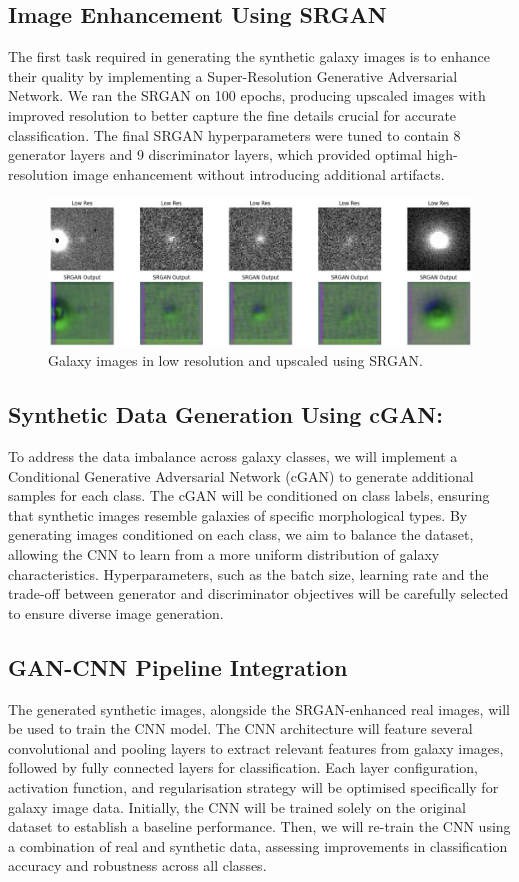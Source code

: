 \documentclass[10pt,twocolumn,letterpaper]{article}
\begin{document}
\subsection{Image Enhancement Using SRGAN}
The first task required in generating the synthetic galaxy images is to enhance their quality by implementing a Super-Resolution Generative Adversarial Network.
We ran the SRGAN on 100 epochs, producing upscaled images with improved resolution to better capture the fine details crucial for accurate classification.
The final SRGAN hyperparameters were tuned to contain 8 generator layers and 9 discriminator layers, which provided optimal high-resolution image enhancement without introducing additional artifacts.
\begin{figure}[htbp]
    \includegraphics[width=\linewidth]{srgan.png}
    \caption{Galaxy images in low resolution and upscaled using SRGAN.}
    \label{fig:galaxysrgan}
  \end{figure}

\subsection{Synthetic Data Generation Using cGAN:} 
To address the data imbalance across galaxy classes, we will implement a Conditional Generative Adversarial Network (cGAN) to generate additional samples for each class. 
The cGAN will be conditioned on class labels, ensuring that synthetic images resemble galaxies of specific morphological types. 
By generating images conditioned on each class, we aim to balance the dataset, allowing the CNN to learn from a more uniform distribution of galaxy characteristics. 
Hyperparameters, such as the batch size, learning rate and the trade-off between generator and discriminator objectives will be carefully selected to ensure diverse image generation.

\subsection{GAN-CNN Pipeline Integration} The generated synthetic images, alongside the SRGAN-enhanced real images, will be used to train the CNN model. 
The CNN architecture will feature several convolutional and pooling layers to extract relevant features from galaxy images, followed by fully connected layers for classification. 
Each layer configuration, activation function, and regularisation strategy will be optimised specifically for galaxy image data. 
Initially, the CNN will be trained solely on the original dataset to establish a baseline performance. 
Then, we will re-train the CNN using a combination of real and synthetic data, assessing improvements in classification accuracy and robustness across all classes.
\end{document}
